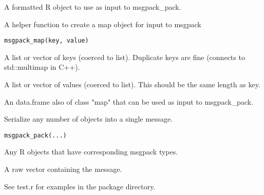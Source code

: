 \documentclass[letterpaper]{book}
\begin{document}
%
\begin{Value}
A formatted R object to use as input to msgpack\_pack.
\end{Value}
%
\begin{Description}\relax
A helper function to create a map object for input to msgpack
\end{Description}
%
\begin{Usage}
\begin{verbatim}
msgpack_map(key, value)
\end{verbatim}
\end{Usage}
%
\begin{Arguments}
\begin{ldescription}
\item[\code{key}] A list or vector of keys (coerced to list).  Duplicate keys are fine (connects to std::multimap in C++).

\item[\code{value}] A list or vector of values (coerced to list).  This should be the same length as key.
\end{ldescription}
\end{Arguments}
%
\begin{Value}
An data.frame also of class "map" that can be used as input to msgpack\_pack.
\end{Value}
%
\begin{Description}\relax
Serialize any number of objects into a single message.
\end{Description}
%
\begin{Usage}
\begin{verbatim}
msgpack_pack(...)
\end{verbatim}
\end{Usage}
%
\begin{Arguments}
\begin{ldescription}
\item[\code{...}] Any R objects that have corresponding msgpack types.
\end{ldescription}
\end{Arguments}
%
\begin{Value}
A raw vector containing the message.
\end{Value}
%
\begin{SeeAlso}\relax
See test.r for examples in the package directory.
\end{SeeAlso}
\end{document}
